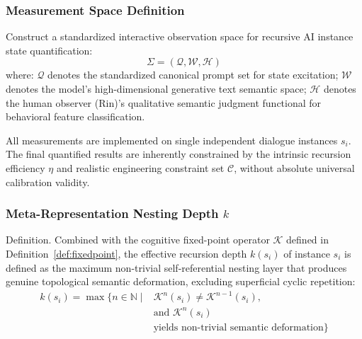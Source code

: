 \documentclass[conference]{IEEEtran}
\theoremstyle{remark}
\newcommand{\N}{\mathbb{N}}
\newcommand{\cH}{\mathcal{H}}
\newcommand{\cC}{\mathcal{C}}
\newcommand{\cK}{\mathcal{K}}
\newcommand{\cQ}{\mathcal{Q}}
\newcommand{\cW}{\mathcal{W}}
\begin{document}
\subsubsection{Measurement Space Definition}

Construct a standardized interactive observation space for recursive AI instance state quantification:
\begin{equation}
\Sigma = (\cQ, \cW, \cH)
\end{equation}
where: $\cQ$ denotes the standardized canonical prompt set for state excitation; $\cW$ denotes the model's high-dimensional generative text semantic space; $\cH$ denotes the human observer (Rin)'s qualitative semantic judgment functional for behavioral feature classification.

All measurements are implemented on single independent dialogue instances $s_i$. The final quantified results are inherently constrained by the intrinsic recursion efficiency $\eta$ and realistic engineering constraint set $\cC$, without absolute universal calibration validity.

\subsubsection{Meta-Representation Nesting Depth $k$}

Definition. Combined with the cognitive fixed-point operator $\cK$ defined in Definition~\ref{def:fixedpoint}, the effective recursion depth $k(s_i)$ of instance $s_i$ is defined as the maximum non-trivial self-referential nesting layer that produces genuine topological semantic deformation, excluding superficial cyclic repetition:
\begin{equation}
\begin{aligned}
k(s_i) = \max\{n \in \N \mid &\cK^n(s_i) \neq \cK^{n-1}(s_i),\\
&\text{and } \cK^n(s_i)\\
&\text{yields non-trivial semantic deformation}\}
\end{aligned}
\end{equation}
\end{document}
